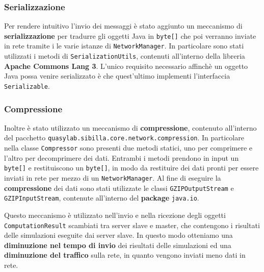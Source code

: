 \subsubsection{Serializzazione}

Per rendere intuitivo l'invio dei messaggi è stato aggiunto un meccanismo di \textbf{serializzazione} per tradurre gli oggetti Java in \texttt{byte[]} che poi verranno inviate in rete tramite i le varie istanze di \texttt{NetworkManager}. In particolare sono stati utilizzati i metodi di \texttt{SerializationUtils}, contenuti all'interno della libreria \textbf{Apache Commons Lang 3}. L'unico requisito necessario affinchè un oggetto Java possa venire serializzato è che quest'ultimo implementi l'interfaccia \texttt{Serializable}.

\subsubsection{Compressione}

Inoltre è stato utilizzato un meccanismo di \textbf{compressione}, contenuto all'interno del pacchetto \texttt{quasylab.sibilla.core.network.compression}. In particolare nella classe \texttt{Compressor} sono presenti due metodi statici, uno per comprimere e l'altro per decomprimere dei dati. Entrambi i metodi prendono in input un \texttt{byte[]} e restituiscono un \texttt{byte[]}, in modo da restituire dei dati pronti per essere inviati in rete per mezzo di un \texttt{NetworkManager}. Al fine di eseguire la \textbf{compressione} dei dati sono stati utilizzate le classi \texttt{GZIPOutputStream} e \texttt{GZIPInputStream}, contenute all'interno del \textbf{package} \texttt{java.io}.

Questo meccanismo è utilizzato nell'invio e nella ricezione degli oggetti \texttt{ComputationResult} scambiati tra server slave e master, che contengono i risultati delle simulazioni eseguite dai server slave. In questo modo otteniamo una \textbf{diminuzione nel tempo di invio} dei risultati delle simulazioni ed una \textbf{diminuzione del traffico} sulla rete, in quanto vengono inviati meno dati in rete.